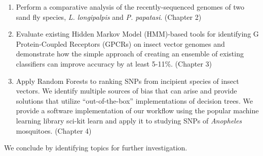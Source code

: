 \begin{enumerate}
\item Perform a comparative analysis of the recently-sequenced genomes of two sand fly species, \emph{L. longipalpis} and \emph{P. papatasi}. (Chapter 2)
\item Evaluate existing Hidden Markov Model (HMM)-based tools for identifying G Protein-Coupled Receptors (GPCRs) on insect vector genomes and demonstrate how the simple approach of creating an ensemble of existing classifiers can improve accuracy by at least 5-11\%. (Chapter 3)
\item Apply Random Forests to ranking SNPs from incipient species of insect vectors.  We identify multiple sources of bias that can arise and provide solutions that utilize ``out-of-the-box'' implementations of decision trees.  We provide a software implementation of our workflow using the popular machine learning library sci-kit learn and apply it to studying SNPs of \emph{Anopheles} mosquitoes. (Chapter 4)
\end{enumerate}

We conclude by identifying topics for further investigation.
